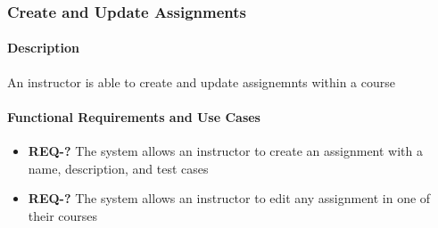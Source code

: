 \documentclass{article}
\begin{document}
\subsubsection{Create and Update Assignments}

\paragraph{Description} An instructor is able to create and update assignemnts within a course

\paragraph{Functional Requirements and Use Cases}

\begin{itemize}
  \item \textbf{REQ-?} The system allows an instructor to create an assignment with a name, description, and test cases
  \item \textbf{REQ-?} The system allows an instructor to edit any assignment in one of their courses
\end{itemize}

\vspace{0.2in}
\end{document}
